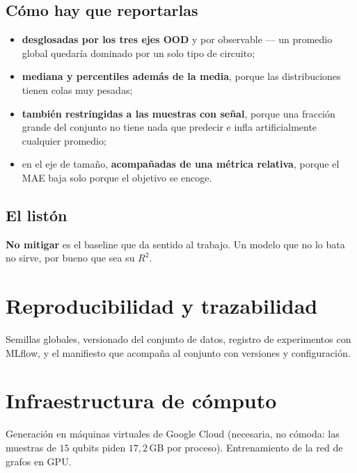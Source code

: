 \subsection{Cómo hay que reportarlas}
\begin{itemize}
    \item \textbf{desglosadas por los tres ejes OOD} y por observable — un promedio global
          quedaría dominado por un solo tipo de circuito;
    \item \textbf{mediana y percentiles además de la media}, porque las distribuciones tienen
          colas muy pesadas;
    \item \textbf{también restringidas a las muestras con señal}, porque una fracción grande
          del conjunto no tiene nada que predecir e infla artificialmente cualquier promedio;
    \item en el eje de tamaño, \textbf{acompañadas de una métrica relativa}, porque el MAE baja
          solo porque el objetivo se encoge.
\end{itemize}

\subsection{El listón}
\textbf{No mitigar} es el baseline que da sentido al trabajo. Un modelo que no lo bata no
sirve, por bueno que sea su $R^2$.

\section{Reproducibilidad y trazabilidad}
\label{sec:mlops}
Semillas globales, versionado del conjunto de datos, registro de experimentos con MLflow, y el
manifiesto que acompaña al conjunto con versiones y configuración.

\section{Infraestructura de cómputo}
\label{sec:infra}
Generación en máquinas virtuales de Google Cloud (necesaria, no cómoda: las muestras de $15$
qubits piden $17{,}2$\,GB por proceso). Entrenamiento de la red de grafos en GPU.
